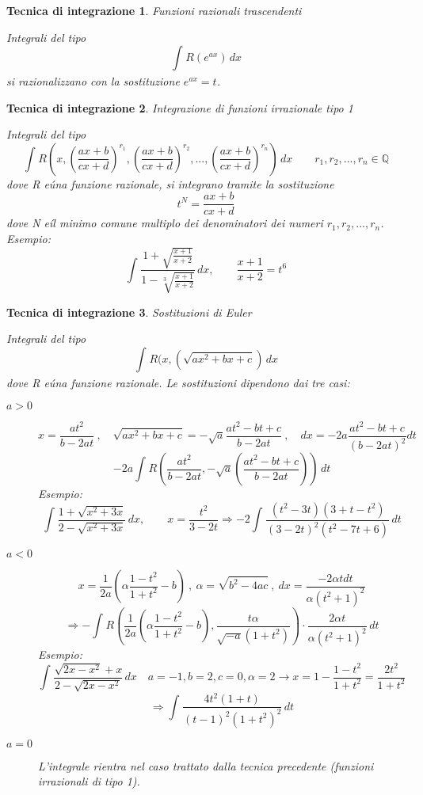 \documentclass[a4paper, titlepage]{report}%
\theoremstyle{definition} %
\theoremstyle{plain}
\theoremstyle{plain}
\theoremstyle{remark}
\theoremstyle{remark}
\theoremstyle{plain}
\theoremstyle{plain}
\theoremstyle{plain}
\theoremstyle{plain}
\theoremstyle{plain}
\newtheorem*{tecnica}{Tecnica di integrazione}
\begin{document}
\begin{tecnica}{Funzioni razionali trascendenti}

   Integrali del tipo 
\[
    \int_{}^{} R(e^{ax}) \,dx         
\]
si razionalizzano con la sostituzione $e^{ax} = t$.
    
\end{tecnica}
\begin{tecnica}{Integrazione di funzioni irrazionale tipo 1}
    
    Integrali del tipo 
    \[
        \int_{}^{} R(x,(\frac{ax+b}{cx+d})^{r_1},
        (\frac{ax+b}{cx+d})^{r_2},...,
        (\frac{ax+b}{cx+d})^{r_n}) \,dx  
        \qquad r_1,r_2,...,r_n \in \mathbb{Q}      
    \]
dove R e\' una funzione razionale, si integrano tramite la sostituzione
\[
   t^N = \frac{ax+b}{cx+d}    
\]
dove N e\' il minimo comune multiplo dei denominatori dei numeri
 $r_1,r_2,...,r_n$. \\
Esempio:
\[
    \int_{}^{} \frac{1+\sqrt{\frac{x+1}{x+2}}}{1- \sqrt[3]{
     \frac{x+1}{x+2}}}\, dx , \qquad \frac{x+1}{x+2} = t^6
\]
\end{tecnica}
\begin{tecnica}{Sostituzioni di Euler}
    
    Integrali del tipo 
    \[
        \int_{}^{} R(x,(\sqrt{ax^2+bx+c}) \, dx      
    \]
dove R e\' una funzione razionale. Le sostituzioni dipendono dai tre casi:
\begin{description}
    \item[$a>0$] 
    \[
      x = \frac{at^2}{b-2at} \ , \quad \sqrt{ax^2+bx+c} = -\sqrt{a}\frac{at^2-bt+c}
      {b-2at} \ , \quad dx = -2a\frac{at^2-bt+c}{(b-2at)^2}dt
    \] 
    \[
       -2a \int_{}^{} R(\frac{at^2}{b-2at}  ,  -\sqrt{a}(\frac{at^2-bt+c}{b-2at}))
       \, dt    
    \]
    Esempio: 
    \[
    \int_{}^{} \frac{1+\sqrt{x^2+3x}}{2-\sqrt{x^2+3x}} \, dx , \qquad x = \frac{t^2}{3-2t}
    \Longrightarrow -2\int_{}^{} \frac{(t^2-3t)(3+t-t^2)}{(3-2t)^2(t^2-7t+6)} \, dt
    \]

    \item[$a<0$]
    \[
    x = \frac{1}{2a}(\alpha \frac{1-t^2}{1+t^2}-b) \ , \ \alpha = \sqrt{b^2-4ac}  
    \ , \ dx = \frac{-2\alpha t dt}{\alpha(t^2+1)^2}  
    \]
    \[
        \Longrightarrow
       - \int_{}^{} R(\frac{1}{2a}(\alpha \frac{1-t^2}{1+t^2}-b), 
       \frac{t\alpha }{\sqrt{-a}(1+t^2)}) \cdot \frac{2\alpha t}{\alpha(t^2+1)^2}
       \, dt
    \]
    Esempio:
    \[
    \int_{}^{} \frac{\sqrt{2x-x^2}+x}{2-\sqrt{2x-x^2}} \, dx
     \quad a = -1,b = 2, c= 0, \alpha = 2 \longrightarrow x = 1- \frac{1-t^2}
     {1+t^2} = \frac{2t^2}{1+t^2}   
    \]
    \[
      \Longrightarrow \int_{}^{} \frac{4t^2(1+t)}{(t-1)^2(1+t^2)^2}\,dt    
    \]
     
    \item[$a=0$] L'integrale rientra nel caso trattato dalla tecnica precedente
    (funzioni irrazionali di tipo 1).  
\end{description}

\end{tecnica}
\end{document}
